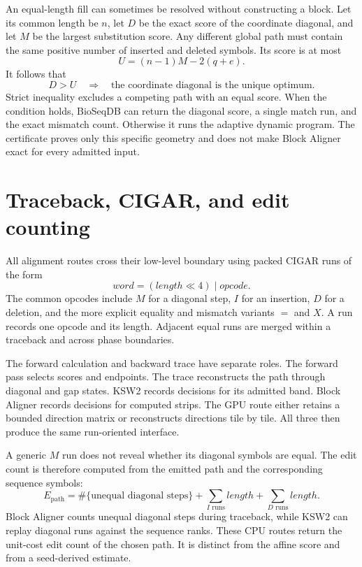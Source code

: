 An equal-length fill can sometimes be resolved without constructing a block.
Let its common length be \(n\), let \(D\) be the exact score of the coordinate
diagonal, and let \(M\) be the largest substitution score. Any different
global path must contain the same positive number of inserted and deleted
symbols. Its score is at most
\[
    U=(n-1)M-2(q+e).
\]
It follows that
\begin{equation}
    D>U \quad\Longrightarrow\quad
    \text{the coordinate diagonal is the unique optimum}.
    \label{eq:block-certificate}
\end{equation}
Strict inequality excludes a competing path with an equal score. When the
condition holds, BioSeqDB can return the diagonal score, a single match run,
and the exact mismatch count. Otherwise it runs the adaptive dynamic program.
The certificate proves only this specific geometry and does not make Block
Aligner exact for every admitted input.

\section{Traceback, CIGAR, and edit counting}
\label{sec:final-alignment-cigar}

All alignment routes cross their low-level boundary using packed CIGAR runs
of the form
\[
        \mathit{word}=(\mathit{length}\ll4)\mid\mathit{opcode}.
\]
The common opcodes include \(M\) for a diagonal step, \(I\) for an insertion,
\(D\) for a deletion, and the more explicit equality and mismatch variants
\(=\) and \(X\). A run records one opcode and its length. Adjacent equal runs
are merged within a traceback and across phase boundaries.

The forward calculation and backward trace have separate roles. The forward
pass selects scores and endpoints. The trace reconstructs the path through
diagonal and gap states. KSW2 records decisions for its admitted band. Block
Aligner records decisions for computed strips. The GPU route either retains a
bounded direction matrix or reconstructs directions tile by tile. All three
then produce the same run-oriented interface.

A generic \(M\) run does not reveal whether its diagonal symbols are equal.
The edit count is therefore computed from the emitted path and the
corresponding sequence symbols:
\[
 E_{\mathrm{path}}=
 \#\{\text{unequal diagonal steps}\}
 +\sum_{I\text{ runs}}\mathit{length}
 +\sum_{D\text{ runs}}\mathit{length}.
\]
Block Aligner counts unequal diagonal steps during traceback, while KSW2 can
replay diagonal runs against the sequence ranks. These CPU routes return the
unit-cost edit count of the chosen path. It is distinct from the affine score
and from a seed-derived estimate.

